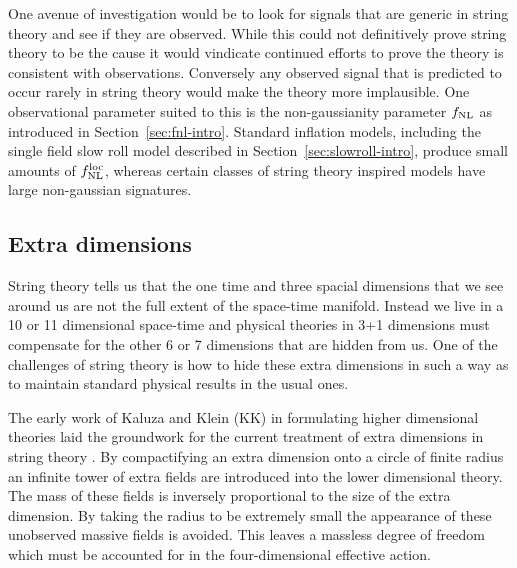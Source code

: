 One avenue of investigation would be to look for signals that are generic in string theory and
see if they are observed. While this could not definitively prove string theory to be the 
cause it would vindicate continued efforts to prove the theory is consistent
with observations. Conversely any observed
signal that is predicted to occur rarely in string theory would make the theory more implausible.
One observational parameter suited to this is the non-gaussianity
parameter $f_{\mathrm{NL}}$ as introduced in Section~\ref{sec:fnl-intro}.
Standard inflation models, including the single field slow roll model described in
Section~\ref{sec:slowroll-intro}, produce small amounts of $f_{\mathrm{NL}}^\mathrm{loc}$, whereas
certain classes of string theory inspired models have large non-gaussian
signatures. 

\subsection{Extra dimensions}
String theory tells us that the one time and three spacial dimensions that we
see
around us are not the full extent of the space-time manifold. Instead
we live in a 10 or
11 dimensional space-time and physical theories in 3+1 dimensions must
compensate for the
other 6 or 7 dimensions that are hidden from us. One of the challenges of string theory is how 
to hide these extra dimensions in such a way as to maintain standard physical
results in the usual
ones. 

The early work of Kaluza and Klein (KK) in formulating higher dimensional 
theories laid the groundwork for the current treatment of extra dimensions in
string theory \cite{Kaluza1921, Klein1926}. By
compactifying an extra dimension onto a circle of finite radius an infinite
tower of extra fields are introduced into the lower dimensional theory. The
mass of these fields is inversely proportional to the size of the extra
dimension. By taking the radius to be extremely small the appearance of these
unobserved massive fields is avoided. This leaves a
massless degree of freedom which must be accounted for in the four-dimensional
effective action. 


